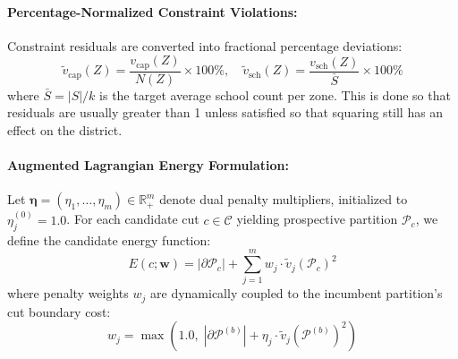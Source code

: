 \documentclass{article}
\begin{document}
\paragraph{Percentage-Normalized Constraint Violations:} Constraint residuals are converted into fractional percentage deviations:
\begin{equation}
\widetilde{v}_{\text{cap}}(Z) = \frac{v_{\text{cap}}(Z)}{N(Z)} \times 100\%, \quad \widetilde{v}_{\text{sch}}(Z) = \frac{v_{\text{sch}}(Z)}{\bar{S}} \times 100\%
\end{equation}
where $\bar{S} = |S|/k$ is the target average school count per zone. This is done so that residuals are usually  greater than 1 unless satisfied so that squaring still has an effect on the district. 


\paragraph{Augmented Lagrangian Energy Formulation:}

Let $\boldsymbol{\eta} = (\eta_1, \dots, \eta_m) \in \mathbb{R}_+^m$ denote dual penalty multipliers, initialized to $\eta_j^{(0)} = 1.0$. For each candidate cut $c \in \mathcal{C}$ yielding prospective partition $\mathcal{P}_c$, we define the candidate energy function:
\begin{equation}
E(c; \mathbf{w}) = |\partial \mathcal{P}_c| + \sum_{j=1}^m w_j \cdot \widetilde{v}_j(\mathcal{P}_c)^2
\end{equation}
where penalty weights $w_j$ are dynamically coupled to the incumbent partition's cut boundary cost:
\begin{equation}
w_j = \max\left(1.0, \; |\partial \mathcal{P}^{(b)}| + \eta_j \cdot \widetilde{v}_j(\mathcal{P}^{(b)})^2\right)
\end{equation}
\end{document}
